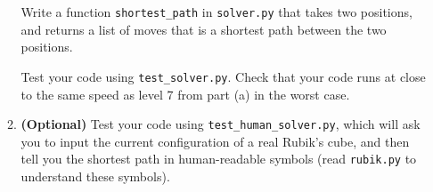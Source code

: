 \documentclass[12pt,twoside]{article}
\begin{document}
\begin{enumerate}
\begin{enumerate}
    Write a function \texttt{shortest\_path} in \texttt{solver.py} that
    takes two positions, and returns a list of moves that is a
    shortest path between the two positions.

    Test your code using \texttt{test\_solver.py}. Check that your
    code runs at close to the same speed as level 7 from part (a) in
    the worst case.

  \item {\bf (Optional)} Test your code using
  \texttt{test\_human\_solver.py}, which will ask you to input the
  current configuration of a real Rubik's cube, and then tell you the
  shortest path in human-readable symbols (read \texttt{rubik.py} to
  understand these symbols).

  \end{enumerate}

\end{enumerate}
\end{document}
